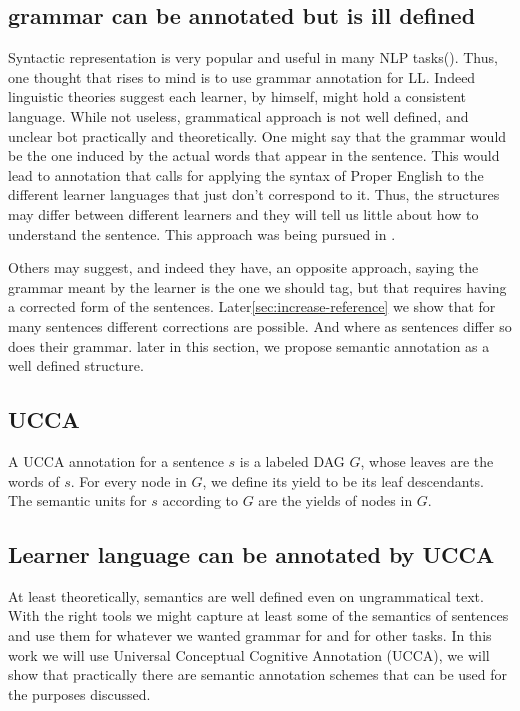 \documentclass[english]{article}
\begin{document}
\subsection{grammar can be annotated but is ill defined}

Syntactic representation is very popular and useful in many NLP tasks(\cite{mesfar2007named,ng2002improving,zollmann2006syntax}).
Thus, one thought that rises to mind is to use grammar annotation
for LL. Indeed linguistic theories suggest each learner, by himself, might hold a consistent language\cite{huebner1985system,tarone1983variability}. While not useless, grammatical approach is not well
defined, and unclear bot practically and theoretically. One might
say that the grammar would be the one induced by the actual words
that appear in the sentence. This would lead to annotation that calls
for applying the syntax of Proper English to the different learner
languages that just don't correspond to it. Thus, the structures may
differ between different learners and they will tell us little about
how to understand the sentence. This approach was being pursued in
\cite{berzak2016universal,ragheb2012defining}. 

Others may suggest, and indeed they have\cite{nagataphrase}, an opposite
approach, saying the grammar meant by the learner is the one we should
tag, but that requires having a corrected form of the sentences. Later\ref{sec:increase-reference}
we show that for many sentences different corrections are possible.
And where as sentences differ so does their grammar. later in this
section, we propose semantic annotation as a well defined structure.

\subsection{UCCA}
A UCCA annotation for a sentence $s$ is a labeled DAG $G$, whose
leaves are the words of $s$. For every node in $G$,
we define its yield to be its leaf descendants. The
semantic units for $s$ according to $G$ are the yields
of nodes in $G$.

\subsection{Learner language can be annotated by UCCA}

At least theoretically, semantics are well defined even on ungrammatical
text. With the right tools we might capture at least some of the semantics
of sentences and use them for whatever we wanted grammar for and for
other tasks. In this work we will use Universal Conceptual Cognitive
Annotation (UCCA)\cite{abend2013universal}, we will show that practically
there are semantic annotation schemes that can be used for the purposes
discussed.
\end{document}

